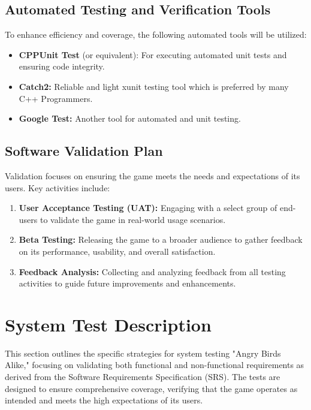 \documentclass[12pt]{article}
\begin{document}
\subsection{Automated Testing and Verification Tools}
To enhance efficiency and coverage, the following automated tools will be utilized:

\begin{itemize}
    \item \textbf{CPPUnit Test} (or equivalent): For executing automated unit tests and ensuring code integrity.
    \item \textbf{Catch2:} Reliable and light xunit testing tool which is preferred by many C++ Programmers.
    \item \textbf{Google Test:} Another tool for automated and unit testing.
\end{itemize}

\subsection{Software Validation Plan}
Validation focuses on ensuring the game meets the needs and expectations of its users. Key activities include:

\begin{enumerate}
    \item \textbf{User Acceptance Testing (UAT):} Engaging with a select group of end-users to validate the game in real-world usage scenarios.
    \item \textbf{Beta Testing:} Releasing the game to a broader audience to gather feedback on its performance, usability, and overall satisfaction.
    \item \textbf{Feedback Analysis:} Collecting and analyzing feedback from all testing activities to guide future improvements and enhancements.
\end{enumerate}

\section{System Test Description}

This section outlines the specific strategies for system testing "Angry Birds Alike," focusing on validating both functional and non-functional requirements as derived from the Software Requirements Specification (SRS). The tests are designed to ensure comprehensive coverage, verifying that the game operates as intended and meets the high expectations of its users.
\end{document}
